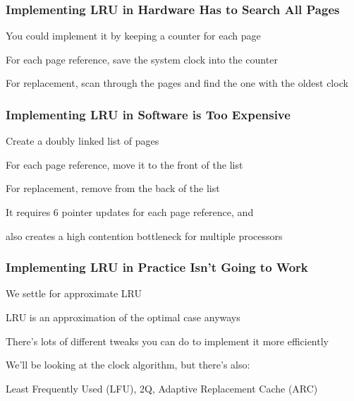   \begin{frame}
    \frametitle{Implementing LRU in Hardware Has to Search All Pages}

    You could implement it by keeping a counter for each page

    \vspace{2em}

    For each page reference, save the system clock into the counter

    \vspace{2em}

    For replacement, scan through the pages and find the one with the oldest clock
  \end{frame}

  \begin{frame}
    \frametitle{Implementing LRU in Software is Too Expensive}

    Create a doubly linked list of pages

    \vspace{2em}

    For each page reference, move it to the front of the list

    \vspace{2em}

    For replacement, remove from the back of the list

    \vspace{2em}

    It requires 6 pointer updates for each page reference, and

    \hspace{2em} also creates a high contention bottleneck for multiple processors
  \end{frame}

  \begin{frame}
    \frametitle{Implementing LRU in Practice Isn't Going to Work}

    We settle for approximate LRU

    \hspace{2em} LRU is an approximation of the optimal case anyways

    \vspace{2em}

    There's lots of different tweaks you can do to implement it more efficiently

    \vspace{2em}

    We'll be looking at the clock algorithm, but there's also:

    \hspace{2em} Least Frequently Used (LFU), 2Q, Adaptive Replacement Cache (ARC)
  \end{frame}


